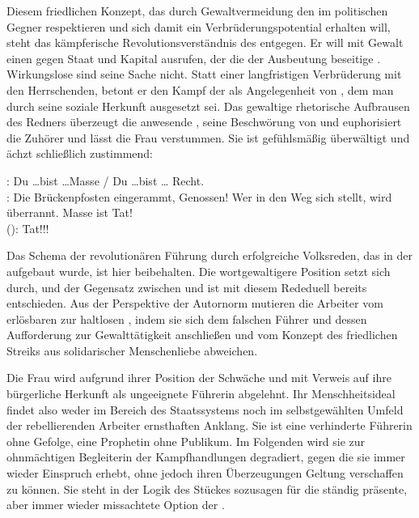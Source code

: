 Diesem friedlichen Konzept, das durch Gewaltvermeidung den \Cite{Menschen} im
politischen Gegner respektieren und sich damit ein Verbrüderungspotential 
erhalten will, steht das kämpferische Revolutionsverständnis des
\Cite{Namenlosen} entgegen. Er will mit Gewalt einen \Cite{Krieg} gegen Staat
und Kapital ausrufen, der die \Cite{Fundamente} der Ausbeutung
beseitige .
Wirkungslose \Cite{schöne Reden}  sind seine Sache nicht. Statt
einer langfristigen Verbrüderung mit den Herrschenden, betont er den Kampf der
\Cite{Masse} als Angelegenheit von \Cite{Schicksal}, dem man durch seine soziale
Herkunft ausgesetzt sei. Das gewaltige rhetorische Aufbrausen des Redners
überzeugt die anwesende \Cite{Masse}, seine Beschwörung von \Cite{Kraft} und
\Cite{Tat} euphorisiert die Zuhörer und lässt die Frau verstummen. Sie ist
gefühlsmäßig überwältigt und ächzt schließlich zustimmend: 

\begin{BlockQuote}
: Du \ldots bist \ldots Masse / Du \ldots bist \ldots
Recht.\\
: Die Brückenpfosten eingerammt, Genossen! Wer in den Weg
sich stellt, wird überrannt. Masse ist Tat!\\
 (): Tat!!!
\end{BlockQuote}
Das Schema der revolutionären Führung durch erfolgreiche Volksreden, das in
der  aufgebaut wurde, ist hier beibehalten. Die
wortgewaltigere Position setzt sich durch, und
der Gegensatz zwischen \Cite{Mensch} und \Cite{Masse} ist mit diesem Rededuell bereits
entschieden. Aus der Perspektive der Autornorm mutieren die Arbeiter vom
erlösbaren \Cite{Volk} zur haltlosen \Cite{Masse}, indem sie sich dem falschen
Führer und dessen Aufforderung zur Gewalttätigkeit anschließen und vom Konzept
des friedlichen Streiks aus solidarischer Menschenliebe abweichen. 

Die Frau wird aufgrund ihrer Position der Schwäche und mit Verweis auf ihre
bürgerliche Herkunft als ungeeignete Führerin abgelehnt. Ihr Menschheitsideal
findet also weder im Bereich des Staatssystems noch im selbstgewählten Umfeld der
rebellierenden Arbeiter ernsthaften Anklang. Sie ist eine verhinderte Führerin
ohne Gefolge, eine Prophetin ohne Publikum. Im Folgenden wird sie zur
ohnmächtigen Begleiterin der Kampfhandlungen degradiert, gegen die sie immer
wieder Einspruch erhebt, ohne jedoch ihren Überzeugungen Geltung verschaffen
zu können. Sie steht in der Logik des Stückes sozusagen für die ständig
präsente, aber immer wieder missachtete Option der \Cite{Menschlichkeit}.
 
